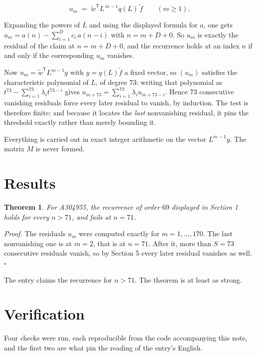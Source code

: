 \documentclass[11pt]{article}
\newtheorem{theorem}{Theorem}
\theoremstyle{definition}
\begin{document}
\[u_m \;=\; \tilde w^{\mathsf T} L^{\,m-1} q(L)\,\tilde f \qquad (m \ge 1).\]

Expanding the powers of $L$ and using the displayed formula for $a$, one gets $u_m = a(n) - \sum_{i=1}^{D} c_i\,a(n-i)$ with $n = m + D + 0$. So $u_m$ is exactly the residual of the claim at $n = m + D + 0$, and the recurrence holds at an index $n$ if and only if the corresponding $u_m$ vanishes.

Now $u_m = \tilde w^{\mathsf T} L^{m-1} y$ with $y = q(L)\tilde f$ a fixed vector, so $(u_m)$ satisfies the characteristic polynomial of $L$, of degree $73$: writing that polynomial as $t^{73} - \sum_{i=1}^{73} \lambda_i t^{73-i}$ gives $u_{m+73} = \sum_{i=1}^{73} \lambda_i u_{m+73-i}$. Hence $73$ consecutive vanishing residuals force every later residual to vanish, by induction. The test is therefore finite; and because it locates the {\itshape last} nonvanishing residual, it pins the threshold exactly rather than merely bounding it.

Everything is carried out in exact integer arithmetic on the vector $L^{m-1}y$. The matrix $M$ is never formed.

\section{Results}

\begin{theorem} For A304955, the recurrence of order $69$ displayed in Section 1 holds for every $n > 71$, and fails at $n = 71$.\end{theorem}

{\itshape Proof.} The residuals $u_m$ were computed exactly for $m = 1,\dots,170$. The last nonvanishing one is at $m = 2$, that is at $n = 71$. After it, more than $S = 73$ consecutive residuals vanish, so by Section 5 every later residual vanishes as well. $\square$

The entry claims the recurrence for $n > 71$. The theorem is at least as strong.

\section{Verification}

Four checks were run, each reproducible from the code accompanying this note, and the first two are what pin the reading of the entry's English.
\end{document}

